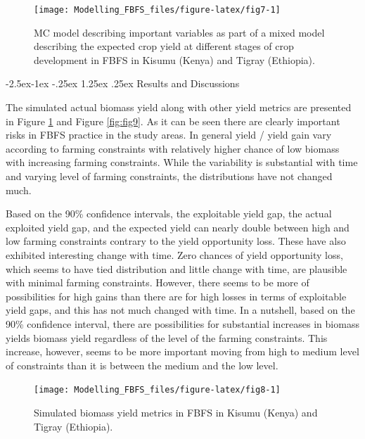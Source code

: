 \documentclass[12pt,oneside]{article}
\makeatletter
\renewcommand\paragraph{\@startsection{paragraph}{4}{\z@}%
            {-2.5ex\@plus -1ex \@minus -.25ex}%
            {1.25ex \@plus .25ex}%
            {\normalfont\normalsize\bfseries}}
\makeatother
\begin{document}
\begin{figure}[!htbp]

{\centering \texttt{[image: Modelling\_FBFS\_files/figure-latex/fig7-1]} 

}

\caption{MC model describing important variables as part of a mixed model describing the expected crop yield at different stages of crop development in FBFS in Kisumu (Kenya) and Tigray (Ethiopia).}\label{fig:fig7}
\end{figure}

\hypertarget{IV223}{%
\paragraph{Results and Discussions}\label{IV223}}

The simulated actual biomass yield along with other yield metrics are presented in Figure \ref{fig:fig7} and Figure \ref{fig:fig9}. As it can be seen there are clearly important risks in FBFS practice in the study areas. In general yield / yield gain vary according to farming constraints with relatively higher chance of low biomass with increasing farming constraints. While the variability is substantial with time and varying level of farming constraints, the distributions have not changed much.

Based on the 90\% confidence intervals, the exploitable yield gap, the actual exploited yield gap, and the expected yield can nearly double between high and low farming constraints contrary to the yield opportunity loss. These have also exhibited interesting change with time. Zero chances of yield opportunity loss, which seems to have tied distribution and little change with time, are plausible with minimal farming constraints. However, there seems to be more of possibilities for high gains than there are for high losses in terms of exploitable yield gaps, and this has not much changed with time. In a nutshell, based on the 90\% confidence interval, there are possibilities for substantial increases in biomass yields biomass yield regardless of the level of the farming constraints. This increase, however, seems to be more important moving from high to medium level of constraints than it is between the medium and the low level.

\begin{figure}[!htbp]

{\centering \texttt{[image: Modelling\_FBFS\_files/figure-latex/fig8-1]} 

}

\caption{Simulated biomass yield metrics in FBFS in Kisumu (Kenya) and Tigray (Ethiopia).}\label{fig:fig8}
\end{figure}
\end{document}
